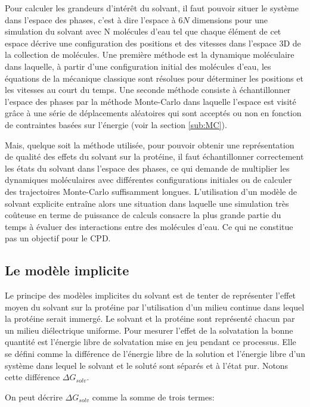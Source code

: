 Pour calculer les grandeurs d'intérêt du solvant, il faut pouvoir situer le système dans l'espace des phases, c'est à dire l'espace à $6 N$ dimensions pour une simulation du solvant avec N molécules d'eau tel que chaque élément de cet espace décrive une configuration des positions et des vitesses dans l'espace 3D de la collection de molécules.
Une première méthode est la dynamique moléculaire dans laquelle, à partir d'une configuration initial des molécules d'eau, les équations de la mécanique classique sont résolues pour déterminer les positions et les vitesses au court du temps. Une seconde méthode consiste à échantillonner l'espace des phases par la méthode Monte-Carlo dans laquelle l'espace est visité grâce à une série de déplacements aléatoires qui sont acceptés ou non en fonction de contraintes basées sur l'énergie (voir la section \ref{sub:MC}).

Mais, quelque soit la méthode utilisée, pour pouvoir obtenir une représentation de qualité des effets du solvant sur la protéine, il faut échantillonner correctement les états du solvant dans l'espace des phases, ce qui demande de multiplier les dynamiques moléculaires avec différentes configurations initiales ou de calculer des trajectoires Monte-Carlo suffisamment longues.
L'utilisation d'un modèle de solvant explicite entraîne alors une situation dans laquelle une simulation très coûteuse en terme de puissance de calculs consacre la plus grande partie du temps à évaluer des interactions entre des molécules d'eau. Ce qui ne constitue pas un objectif pour le CPD.

\subsection{Le modèle implicite}

Le principe des modèles implicites du solvant est de tenter de représenter l'effet moyen du solvant sur la protéine par l'utilisation d'un milieu continue dans lequel la protéine serait immergé. Le solvant et la protéine sont représenté chacun par un milieu diélectrique uniforme.
Pour mesurer l'effet de la solvatation la bonne quantité est l'énergie libre de solvatation mise en jeu pendant ce processus. Elle se défini comme la différence de l'énergie libre de la solution et l'énergie libre d'un système dans lequel le solvant et le soluté sont séparés et à l'état pur. Notons cette différence $\Delta G_{solv}$.

On peut décrire $\Delta G_{solv}$ comme la somme de trois termes:

